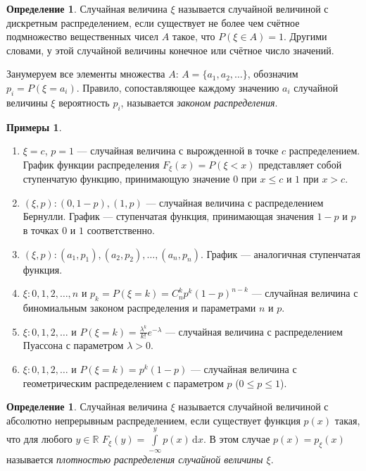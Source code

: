\documentclass[11pt,openany,a4paper]{scrartcl}
\theoremstyle{plain}
\theoremstyle{definition}
\newtheorem{definition}[theorem]{Определение}
\newtheorem{examples}[theorem]{Примеры}
\newcommand\mb{\mathbb}
\newcommand\real{\mb R}
\newcommand{\dif}{\, \mathrm d}
\newcommand{\funcdistr}{F_\xi}
\begin{document}
\begin{definition}
    Случайная величина $\xi$ называется случайной величиной с дискретным 
    распределением, если существует не более чем счётное подмножество
    вещественных чисел $A$ такое, что $P(\xi \in A) = 1$. Другими словами, у этой
    случайной величины конечное или счётное число значений.
\end{definition}

Занумеруем все элементы множества $A$: $A = \{a_1, a_2,\ldots\}$, обозначим
$p_i = P(\xi = a_i)$. Правило, сопоставляющее каждому значению $a_i$ случайной
величины $\xi$ вероятность $p_i$, называется \emph{законом распределения}.
\begin{examples}
    \begin{enumerate}
        \item $\xi = c$, $p = 1$ — случайная величина с вырожденной в точке
        $c$ распределением. График функции распределения $\funcdistr(x) =
        P(\xi < x)$ представляет собой ступенчатую функцию, принимающую
        значение $0$ при $x \leqslant c$ и $1$ при $x > c$.
        \item $(\xi, p): (0, 1-p), (1, p)$ — случайная величина с
        распределением Бернулли. График — ступенчатая функция, принимающая значения
        $1-p$ и $p$ в точках $0$ и $1$ соответственно.
        \item $(\xi, p): (a_1, p_1), (a_2, p_2), \ldots, (a_n, p_n)$. График —
        аналогичная ступенчатая функция.
        \item $\xi: 0, 1, 2, \ldots, n$ и $p_k = P(\xi = k) = C_n^k p^k(1-p)^{n-k}$ 
        — случайная величина с биномиальным законом распределения и
        параметрами $n$ и $p$.
        \item $\xi: 0, 1, 2, \ldots$ и
        $P(\xi = k) = \frac{\lambda^k}{k!}e^{-\lambda}$ — случайная величина
        с распределением Пуассона с параметром $\lambda > 0$.
        \item $\xi: 0, 1, 2, \ldots$ и $P(\xi = k) = p^k(1-p)$ —
        случайная величина с геометрическим распределением с параметром
        $p$ ($0 \leqslant p \leqslant 1$).
    \end{enumerate}
\end{examples}
\begin{definition}
    Случайная величина $\xi$ называется случайной величиной с абсолютно 
    непрерывным распределением, если существует функция $p(x)$ такая, что
    для любого $y \in \real$ $F_\xi(y) = \int\limits_{-\infty}^y p(x) \dif x$.
    В этом случае $p(x) = p_\xi(x)$ называется \emph{плотностью распределения 
    случайной величины $\xi$}.
\end{definition}
\end{document}
